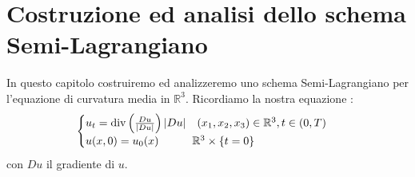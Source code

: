 \chapter{Costruzione ed analisi dello schema Semi-Lagrangiano}
In questo capitolo costruiremo ed analizzeremo uno schema Semi-Lagrangiano per l'equazione di curvatura media in $\mathbb{R}^3$.
Ricordiamo la nostra equazione :
\begin{equation}
\label{eq:cp3-01}
\begin{cases}
u_t = \operatorname{div}\left(\frac{Du}{|Du|}\right)|Du|\quad (x_1,x_2,x_3)\in\mathbb{R}^3,t\in(0,T) \\
u(x,0) = u_0(x) \qquad \quad \mathbb{R}^3\times\{t = 0\}
\end{cases}
\end{equation}
con $Du$ il gradiente di $u$.
%
